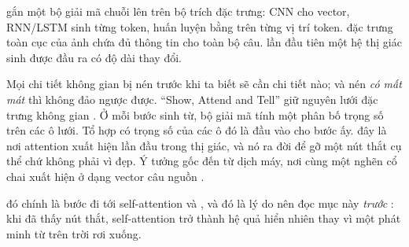 \documentclass[../../../deep_learning.tex]{subfiles}
\begin{document}
\begin{mach}
\item {} \gp gắn một bộ giải mã chuỗi lên trên bộ trích đặc trưng: CNN cho vector, RNN/LSTM sinh từng token, huấn luyện bằng  trên từng vị trí token. \gd đặc trưng toàn cục của ảnh chứa đủ thông tin cho toàn bộ câu. \hq lần đầu tiên một hệ thị giác sinh được đầu ra có độ dài thay đổi.
\item {} Mọi chi tiết không gian bị nén trước khi ta biết sẽ cần chi tiết nào; và nén \emph{có mất mát} thì không đảo ngược được. \gp ``Show, Attend and Tell'' giữ nguyên lưới đặc trưng không gian \cite{xu2015show}. Ở mỗi bước sinh từ, bộ giải mã tính một phân bố trọng số trên các ô lưới. Tổ hợp có trọng số của các ô đó là đầu vào cho bước ấy. \hq đây là nơi attention xuất hiện lần đầu trong thị giác, và nó ra đời để gỡ một nút thắt cụ thể chứ không phải vì đẹp. Ý tưởng gốc đến từ dịch máy, nơi cùng một nghẽn cổ chai xuất hiện ở dạng vector câu nguồn \cite{bahdanau2015neural}.
\item {} \gp đó chính là bước đi tới self-attention và  \cite{vaswani2017attention}, và đó là lý do nên đọc mục này \emph{trước} : khi đã thấy nút thắt, self-attention trở thành hệ quả hiển nhiên thay vì một phát minh từ trên trời rơi xuống.
\end{mach}
\end{document}
